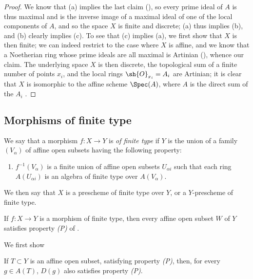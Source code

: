 \begin{proof}
We know that (a) implies the last claim (\cite[p.~205, th.~3]{I-13}), so every prime ideal of $A$ is thus maximal and is the inverse image of a maximal ideal of one of the local components of $A$, and so the space $X$ is finite and discrete;
(a) thus implies (b), and (b) clearly implies (c).
To see that (c) implies (a), we first show that $X$ is then finite;
we can indeed restrict to the case where $X$ is affine, and we know that a Noetherian ring whose prime ideals are all maximal is Artinian (\cite[p.~203]{I-13}), whence our claim.
The underlying space $X$ is then discrete, the topological sum of a finite number of points $x_i$, and the local rings $\sh{O}_{x_i}=A_i$ are Artinian;
it is clear that $X$ is isomorphic to the affine scheme $\Spec(A)$, where $A$ is the direct sum of the $A_i$ .
\end{proof}

\subsection{Morphisms of finite type}
\label{subsection:I.6.3}

\begin{definition}[6.3.1]
\label{I.6.3.1}
We say that a morphism $f:X\to Y$ is \emph{of finite type} if $Y$ is the union of a family $(V_\alpha)$ of affine open subsets having the following property:
\begin{enumerate}
  \item[(P)] $f^{-1}(V_\alpha)$ is a finite union of affine open subsets $U_{\alpha i}$ such that each ring $A(U_{\alpha i})$ is an algebra of finite type over $A(V_\alpha)$.
\end{enumerate}
We then say that $X$ is a prescheme of finite type over $Y$, or a $Y$-prescheme of finite type.
\end{definition}

\begin{proposition}[6.3.2]
\label{I.6.3.2}
If $f:X\to Y$ is a morphism of finite type, then every affine open subset $W$ of $Y$ satisfies property \emph{(P)} of .
\end{proposition}

We first show
\begin{lemma}[6.3.2.1]
\label{I.6.3.2.1}
If $T\subset Y$ is an affine open subset, satisfying property \emph{(P)}, then, for every $g\in A(T)$, $D(g)$ also satisfies property \emph{(P)}.
\end{lemma}

